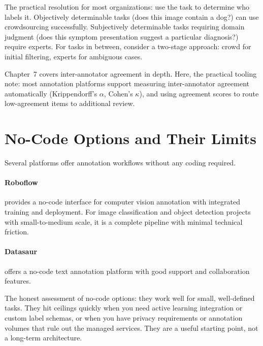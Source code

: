 The practical resolution for most organizations: use the task to determine who labels it. Objectively determinable tasks (does this image contain a dog?) can use crowdsourcing successfully. Subjectively determinable tasks requiring domain judgment (does this symptom presentation suggest a particular diagnosis?) require experts. For tasks in between, consider a two-stage approach: crowd for initial filtering, experts for ambiguous cases.

Chapter~7 covers inter-annotator agreement in depth. Here, the practical tooling note: most annotation platforms support measuring inter-annotator agreement automatically (Krippendorff's $\alpha$, Cohen's $\kappa$), and using agreement scores to route low-agreement items to additional review.

\section{No-Code Options and Their Limits}
\label{sec:ch09-no-code}

Several platforms offer annotation workflows without any coding required.

\paragraph{Roboflow} provides a no-code interface for computer vision annotation with integrated training and deployment. For image classification and object detection projects with small-to-medium scale, it is a complete pipeline with minimal technical friction.

\paragraph{Datasaur} offers a no-code text annotation platform with good \nlp support and collaboration features.

The honest assessment of no-code options: they work well for small, well-defined tasks. They hit ceilings quickly when you need active learning integration or custom label schemas, or when you have privacy requirements or annotation volumes that rule out the managed services. They are a useful starting point, not a long-term architecture.

